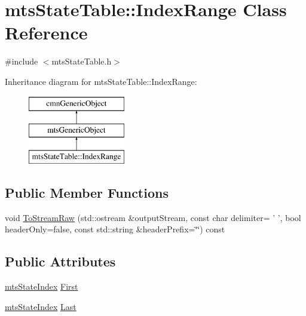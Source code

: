 \hypertarget{classmts_state_table_1_1_index_range}{\section{mts\-State\-Table\-:\-:Index\-Range Class Reference}
\label{classmts_state_table_1_1_index_range}
}


{\ttfamily \#include $<$mts\-State\-Table.\-h$>$}

Inheritance diagram for mts\-State\-Table\-:\-:Index\-Range\-:\begin{figure}[H]
\begin{center}
\leavevmode
\includegraphics[height=3.000000cm]{dc/d1f/classmts_state_table_1_1_index_range}
\end{center}
\end{figure}
\subsection*{Public Member Functions}
\begin{DoxyCompactItemize}
\item 
void \hyperlink{classmts_state_table_1_1_index_range_aee1ef0cd5b41b955416cce4212dd398d}{To\-Stream\-Raw} (std\-::ostream \&output\-Stream, const char delimiter= ' ', bool header\-Only=false, const std\-::string \&header\-Prefix=\char`\"{}\char`\"{}) const 
\end{DoxyCompactItemize}
\subsection*{Public Attributes}
\begin{DoxyCompactItemize}
\item 
\hyperlink{classmts_state_index}{mts\-State\-Index} \hyperlink{classmts_state_table_1_1_index_range_aacc156c9559103d4bc2092d96cbe91b0}{First}
\item 
\hyperlink{classmts_state_index}{mts\-State\-Index} \hyperlink{classmts_state_table_1_1_index_range_aa356fdcec51fde7c65c44e768d68258f}{Last}
\end{DoxyCompactItemize}


